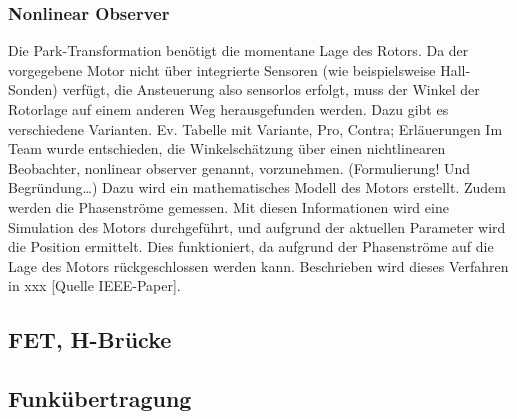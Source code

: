 



\subsubsection*{Nonlinear Observer}
Die Park-Transformation benötigt die momentane Lage des Rotors. Da der vorgegebene Motor nicht über integrierte Sensoren (wie beispielsweise Hall-Sonden) verfügt, die Ansteuerung also sensorlos erfolgt, muss der Winkel der Rotorlage auf einem anderen Weg herausgefunden werden. Dazu gibt es verschiedene Varianten. 
Ev. Tabelle mit Variante, Pro, Contra; Erläuerungen 
Im Team wurde entschieden, die Winkelschätzung über einen nichtlinearen Beobachter, nonlinear observer genannt, vorzunehmen. (Formulierung! Und Begründung…) Dazu wird ein mathematisches Modell des Motors erstellt. Zudem werden die Phasenströme gemessen. Mit diesen Informationen wird eine Simulation des Motors durchgeführt, und aufgrund der aktuellen Parameter wird die Position ermittelt. Dies funktioniert, da aufgrund der Phasenströme auf die Lage des Motors rückgeschlossen werden kann. Beschrieben wird dieses Verfahren in xxx [Quelle IEEE-Paper].

\subsection{FET, H-Brücke}
\label{tGl_HBrugg}
\subsection{Funkübertragung}
\label{tGl_RF}
